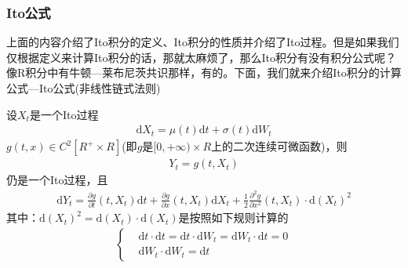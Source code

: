         \subsubsection{Ito公式}
            \label{subsubsec:Ito公式}
            \par
            上面的内容介绍了Ito积分的定义、Ito积分的性质并介绍了Ito过程。但是如果我们仅根据定义来计算Ito积分的话，那就太麻烦了，那么Ito积分有没有积分公式呢？像R积分中有牛顿—莱布尼茨共识那样，有的。下面，我们就来介绍Ito积分的计算公式—Ito公式(非线性链式法则)
            \begin{theorem}[Ito公式]
                设$X_t$是一个Ito过程
                \begin{align*}
                    \mathrm{d}X_t = \mu(t )\mathrm{d}t+\sigma(t)\mathrm{d}W_t
                \end{align*}
                $g(t,x)\in C^2[R^+\times R]$(即$g$是$[0,+\infty)\times R$上的二次连续可微函数)，则
                \begin{align*}
                Y_t = g(t,X_t)
                \end{align*}
                仍是一个Ito过程，且
                \begin{align}
                    \label{Ito公式}
                    \mathrm{d}Y_t = \frac{\partial g}{\partial t}(t,X_t)\mathrm{d}t +\frac{\partial g}{\partial x}(t,X_t )\mathrm{d}X_t + \frac{1}{2} \frac{\partial^2 g}{\partial x^2}(t,X_t)\cdot
                    \mathrm{d}(X_t)^2
                \end{align}
                其中：$\mathrm{d}(X_t)^2 = \mathrm{d}(X_t)\cdot \mathrm{d}(X_t)$是按照如下规则计算的
                \begin{align}
                    \label{Ito公式微分计算}
                    \left\{
                        \begin{aligned}
                        &\mathrm{d}t\cdot\mathrm{d}t = \mathrm{d}t \cdot \mathrm{d}W_t = \mathrm{d}W_t \cdot \mathrm{d}t  =0\\
                        &\mathrm{d}W_t \cdot\mathrm{d}W_t = \mathrm{d}t
                        \end{aligned}
                    \right.
                \end{align}
            \end{theorem}
